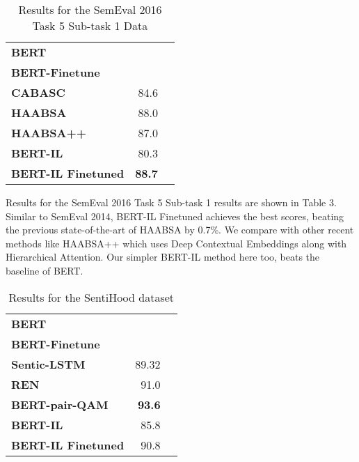 \documentclass[11pt,a4paper]{article}
\begin{document}
\begin{table}[!htp]\centering
\large

\begin{tabular}{lrr}\toprule
\textbf{BERT} & \\
\textbf{BERT-Finetune} & \\
\textbf{CABASC} &84.6 \\
\textbf{HAABSA} &88.0 \\
\textbf{HAABSA++} &87.0 \\
\textbf{BERT-IL} &80.3 \\
\textbf{BERT-IL Finetuned} &\textbf{88.7} \\
\bottomrule
\end{tabular}
\caption{Results for the SemEval 2016 Task 5 Sub-task 1 Data}\label{tab: }
\end{table}




Results for the SemEval 2016 Task 5 Sub-task 1 results are shown in Table 3. Similar to SemEval 2014, BERT-IL Finetuned achieves the best scores, beating the previous state-of-the-art of HAABSA \cite{inbook} by 0.7\%. We compare with other recent methods like HAABSA++ \cite{trusca2020hybrid} which uses Deep Contextual Embeddings along with Hierarchical Attention. Our simpler BERT-IL method here too, beats the baseline of BERT. 

\begin{table}[!htp]\centering
\large
\begin{tabular}{lrr}\toprule
\textbf{BERT} & \\
\textbf{BERT-Finetune} & \\
\textbf{Sentic-LSTM} &89.32 \\
\textbf{REN} &91.0 \\
\textbf{BERT-pair-QAM} &\textbf{93.6} \\
\textbf{BERT-IL} &85.8 \\
\textbf{BERT-IL Finetuned} &90.8 \\
\bottomrule
\end{tabular}
\caption{Results for the SentiHood dataset}\label{tab: }
\end{table}
\end{document}
